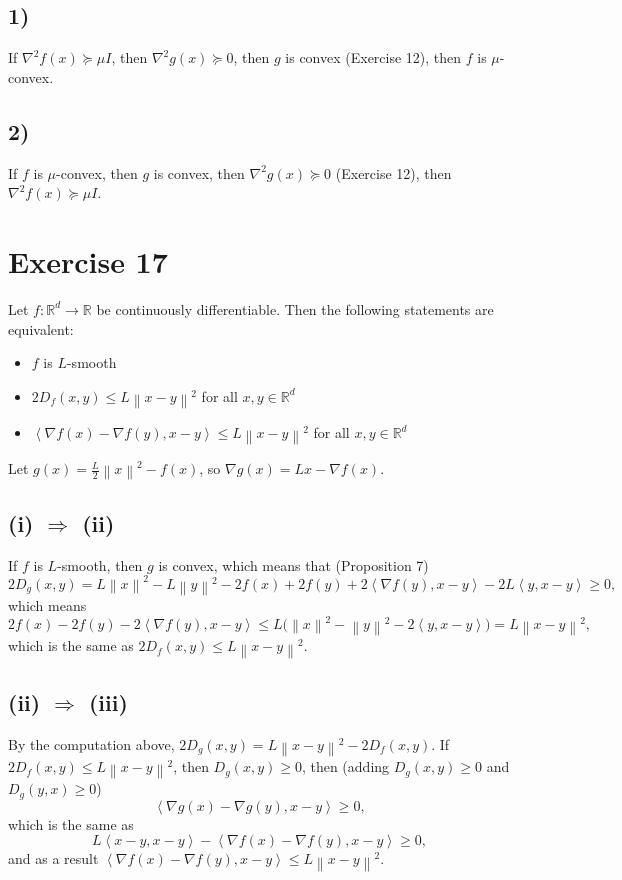 \documentclass[11pt,a4paper]{article}
\newcommand{\R}{\mathbb{R}}
\newcommand{\norm}[1]{\left\| #1 \right\|}
\newcommand{\ip}[2]{\left\langle #1, #2 \right\rangle}
\begin{document}
\subsection*{1)}
If $\nabla^2 f(x) \succeq \mu I$, then $\nabla^2 g(x) \succeq 0$, then $g$ is convex
(Exercise 12), then $f$ is $\mu$-convex.

\subsection*{2)}
If $f$ is $\mu$-convex, then $g$ is convex, then $\nabla^2 g(x) \succeq 0$ (Exercise 12),
then $\nabla^2 f(x) \succeq \mu I$.

\section*{Exercise 17}

Let $f : \R^d \to \R$ be continuously differentiable. Then the following statements are
equivalent:
\begin{itemize}
  \item[(i)] $f$ is $L$-smooth
  \item[(ii)] $2D_f(x,y) \le L\norm{x-y}^2$ for all $x, y \in \R^d$
  \item[(iii)] $\ip{\nabla f(x) - \nabla f(y)}{x-y} \le L\norm{x-y}^2$ for all $x, y \in \R^d$
\end{itemize}
Let $g(x) = \frac{L}{2}\norm{x}^2 - f(x)$, so $\nabla g(x) = Lx - \nabla f(x)$.

\subsection*{(i) $\Rightarrow$ (ii)}
If $f$ is $L$-smooth, then $g$ is convex, which means that (Proposition 7)
\[
  2D_g(x,y) = L\norm{x}^2 - L\norm{y}^2 - 2f(x) + 2f(y) + 2\ip{\nabla f(y)}{x-y}
  - 2L\ip{y}{x-y} \ge 0,
\]
which means
\[
  2f(x) - 2f(y) - 2\ip{\nabla f(y)}{x-y} \le L\bigl(\norm{x}^2 - \norm{y}^2 - 2\ip{y}{x-y}\bigr)
  = L\norm{x-y}^2,
\]
which is the same as $2D_f(x,y) \le L\norm{x-y}^2$.

\subsection*{(ii) $\Rightarrow$ (iii)}
By the computation above, $2D_g(x,y) = L\norm{x-y}^2 - 2D_f(x,y)$. If
$2D_f(x,y) \le L\norm{x-y}^2$, then $D_g(x,y) \ge 0$, then (adding $D_g(x,y) \ge 0$ and
$D_g(y,x) \ge 0$)
\[
  \ip{\nabla g(x) - \nabla g(y)}{x-y} \ge 0,
\]
which is the same as
\[
  L\ip{x-y}{x-y} - \ip{\nabla f(x) - \nabla f(y)}{x-y} \ge 0,
\]
and as a result $\ip{\nabla f(x) - \nabla f(y)}{x-y} \le L\norm{x-y}^2$.
\end{document}
